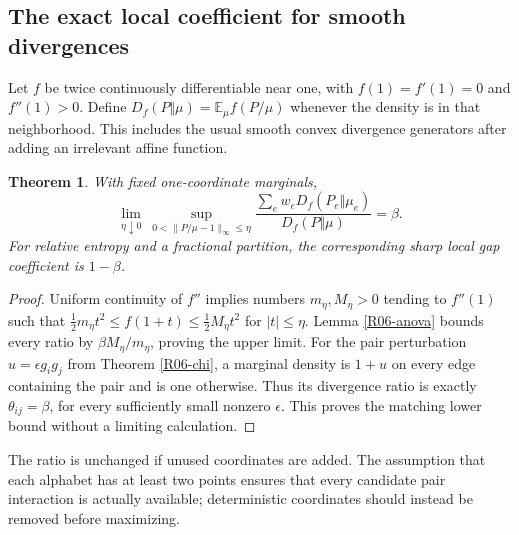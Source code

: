 \documentclass[11pt,a4paper]{article}
\newtheorem{theorem}{Theorem}[section]
\theoremstyle{definition}\newtheorem{definition}[theorem]{Definition}
\theoremstyle{remark}\newtheorem{remark}[theorem]{Remark}
\newcommand{\E}{\mathbb E}\newcommand{\one}{\mathbf 1}\newcommand{\1}{\mathbf 1}
\numberwithin{equation}{section}
\begin{document}
\subsection{The exact local coefficient for smooth divergences}\label{R06-sec-4}
Let $f$ be twice continuously differentiable near one, with $f(1)=f'(1)=0$ and $f''(1)>0$. Define $D_f(P\Vert\mu)=\E_\mu f(P/\mu)$ whenever the density is in that neighborhood. This includes the usual smooth convex divergence generators after adding an irrelevant affine function.
\begin{theorem}\label{R06-local}
With fixed one-coordinate marginals,
\[
\lim_{\eta\downarrow0}\ \sup_{0<\|P/\mu-1\|_\infty\leq\eta}
\frac{\sum_e w_eD_f(P_e\Vert\mu_e)}{D_f(P\Vert\mu)}=\beta.
\]
For relative entropy and a fractional partition, the corresponding sharp local gap coefficient is $1-\beta$.
\end{theorem}
\begin{proof}
Uniform continuity of $f''$ implies numbers $m_\eta,M_\eta>0$ tending to $f''(1)$ such that
$\frac12m_\eta t^2\leq f(1+t)\leq\frac12M_\eta t^2$ for $|t|\leq\eta$. Lemma \ref{R06-anova} bounds every ratio by $\beta M_\eta/m_\eta$, proving the upper limit. For the pair perturbation $u=\epsilon g_ig_j$ from Theorem \ref{R06-chi}, a marginal density is $1+u$ on every edge containing the pair and is one otherwise. Thus its divergence ratio is exactly $\theta_{ij}=\beta$, for every sufficiently small nonzero $\epsilon$. This proves the matching lower bound without a limiting calculation.
\end{proof}
The ratio is unchanged if unused coordinates are added. The assumption that each alphabet has at least two points ensures that every candidate pair interaction is actually available; deterministic coordinates should instead be removed before maximizing.
\end{document}
